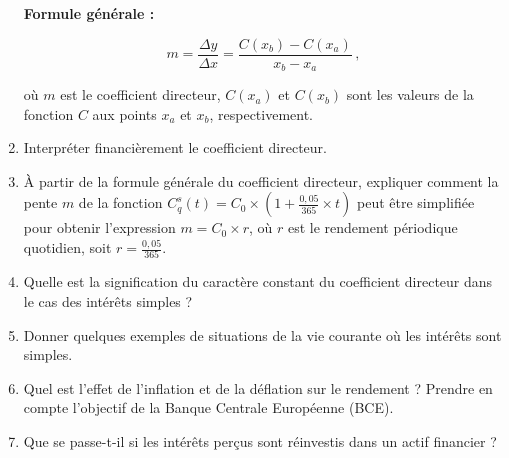 \documentclass{article}
\begin{document}
\begin{enumerate}[label=\textbf{Q\arabic*.}]
\begin{tcolorbox}
        \textbf{Formule générale :}
    
        \[
            m = \frac{\Delta y}{\Delta x} = \frac{C(x_b) - C(x_a)}{x_b - x_a}\,,
        \]
    
        où \( m \) est le coefficient directeur, \( C(x_a) \) et \( C(x_b) \) sont les valeurs de la fonction \( C \) aux points \( x_a \) et \( x_b \), respectivement.
    \end{tcolorbox}

    \item Interpréter financièrement le coefficient directeur.

    \item À partir de la formule générale du coefficient directeur, expliquer comment la pente \( m \) de la fonction \( C_q^s(t) = C_0 \times \left(1 + \frac{0{,}05}{365} \times t\right) \) peut être simplifiée pour obtenir l'expression \( m = C_0 \times r \), où \( r \) est le rendement périodique quotidien, soit \( r = \frac{0{,}05}{365} \).

    \item Quelle est la signification du caractère constant du coefficient directeur dans le cas des intérêts simples ?

    \item Donner quelques exemples de situations de la vie courante où les intérêts sont simples.

    \item Quel est l'effet de l'inflation et de la déflation sur le rendement ? Prendre en compte l'objectif de la Banque Centrale Européenne (BCE).

    \item Que se passe-t-il si les intérêts perçus sont réinvestis dans un actif financier ?

\end{enumerate}

\end{document}
